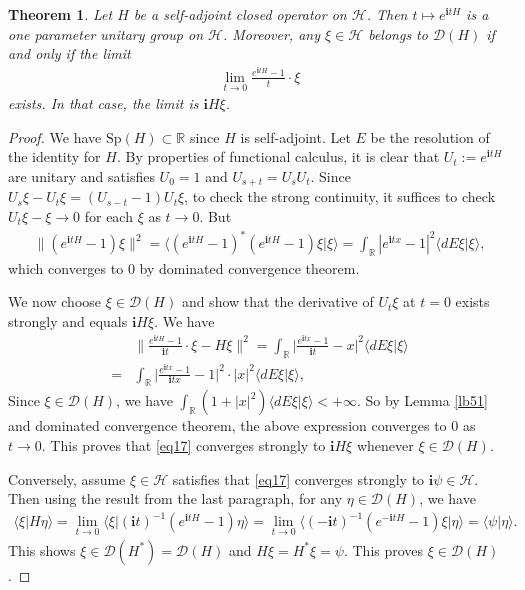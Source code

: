 \documentclass[12pt,b5paper,notitlepage]{article}
\theoremstyle{definition}
\theoremstyle{plain}
\newtheorem{thm}[df]{Theorem}
\newcommand{\mc}{\mathcal}
\newcommand{\Dom}{\scr D}
\newcommand{\bk}[1]{\langle {#1}\rangle}
\newcommand{\scr}{\mathscr}
\newcommand{\im}{\mathbf{i}}
\newcommand{\Rbb}{\mathbb R}
\newcommand{\Sp}{\mathrm{Sp}}
\numberwithin{equation}{section}
\begin{document}
\begin{thm}\label{lb103}
Let $H$ be a self-adjoint closed operator on $\mc H$. Then $t\mapsto e^{\im tH}$ is a one parameter unitary group on $\mc H$. Moreover, any $\xi\in\mc H$ belongs to $\Dom(H)$ if and only if the limit
\begin{align}
\lim_{t\rightarrow 0}\frac{e^{\im tH}-1}{t}\cdot \xi\label{eq17}	
\end{align}
exists. In that case, the limit is $\im H\xi$.
\end{thm}


\begin{proof}
We have $\Sp(H)\subset\Rbb$ since $H$ is self-adjoint. Let $E$ be the resolution of the identity for $H$. By properties of functional calculus, it is clear that $U_t:=e^{\im tH}$ are unitary and satisfies $U_0=1$ and $U_{s+t}=U_sU_t$. Since $U_s\xi-U_t\xi=(U_{s-t}-1)U_t\xi$, to check the strong continuity, it suffices to check $U_t\xi-\xi\rightarrow 0$ for each $\xi$ as $t\rightarrow 0$. But
\begin{align*}
\lVert (e^{\im tH}-1)\xi\lVert^2=\bk{(e^{\im tH}-1)^*(e^{\im tH}-1)\xi|\xi}=\int_\Rbb |e^{\im tx}-1|^2\bk{dE\xi|\xi},
\end{align*}
which converges to $0$ by dominated convergence theorem.

We now choose $\xi\in\Dom(H)$ and show that the derivative of $U_t\xi$ at $t=0$ exists strongly and equals $\im H\xi$. We have
\begin{align}
&\Big\lVert \frac{e^{\im tH}-1}{\im t}\cdot \xi-H\xi  \Big\lVert^2=\int_\Rbb \Big|\frac{e^{\im tx}-1}{\im t}-x  \Big|^2\bk{dE\xi|\xi}\nonumber\\
=&	\int_\Rbb \Big|\frac{e^{\im tx}-1}{\im tx}-1  \Big|^2\cdot |x|^2\bk{dE\xi|\xi},\nonumber
\end{align}
Since $\xi\in\Dom(H)$, we have $\int_\Rbb (1+|x|^2)\bk{dE\xi|\xi}<+\infty$. So by Lemma \ref{lb51} and dominated convergence theorem, the above expression converges to $0$ as $t\rightarrow 0$. This proves that \eqref{eq17} converges strongly to $\im H\xi$ whenever $\xi\in\Dom(H)$.

Conversely, assume $\xi\in\mc H$ satisfies that \eqref{eq17} converges strongly to $\im\psi\in\mc H$. Then using the result from the last paragraph, for any $\eta\in\Dom(H)$, we have
\begin{align}
\bk{\xi|H\eta}=\lim_{t\rightarrow 0}\bk{\xi|(\im t)^{-1}(e^{\im tH}-1)\eta}=\lim_{t\rightarrow 0}\bk{(-\im t)^{-1}(e^{-\im tH}-1)\xi|\eta}=\bk{\psi|\eta}.	\label{eq18}
\end{align}
This shows $\xi\in\Dom(H^*)=\Dom(H)$ and $H\xi=H^*\xi=\psi$. This proves $\xi\in\Dom(H)$.
\end{proof}
\end{document}
